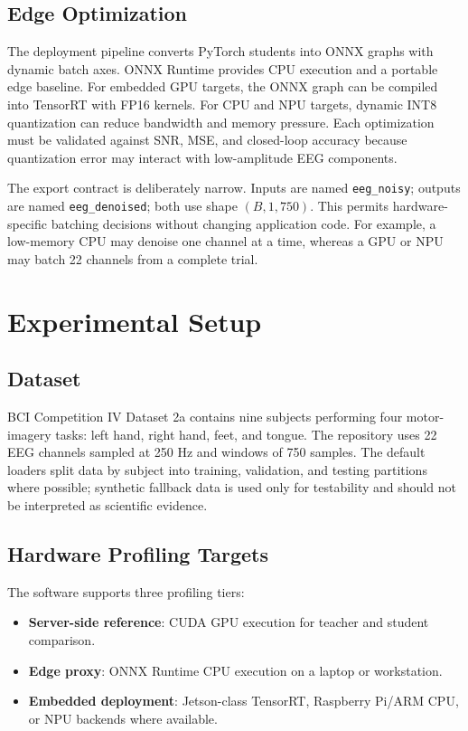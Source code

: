 \documentclass[11pt]{article}
\begin{document}
\subsection{Edge Optimization}

The deployment pipeline converts PyTorch students into ONNX graphs with dynamic batch axes. ONNX Runtime provides CPU execution and a portable edge baseline. For embedded GPU targets, the ONNX graph can be compiled into TensorRT with FP16 kernels. For CPU and NPU targets, dynamic INT8 quantization can reduce bandwidth and memory pressure. Each optimization must be validated against SNR, MSE, and closed-loop accuracy because quantization error may interact with low-amplitude EEG components.

The export contract is deliberately narrow. Inputs are named \texttt{eeg\_noisy}; outputs are named \texttt{eeg\_denoised}; both use shape \((B,1,750)\). This permits hardware-specific batching decisions without changing application code. For example, a low-memory CPU may denoise one channel at a time, whereas a GPU or NPU may batch 22 channels from a complete trial.

\section{Experimental Setup}

\subsection{Dataset}

BCI Competition IV Dataset 2a contains nine subjects performing four motor-imagery tasks: left hand, right hand, feet, and tongue. The repository uses 22 EEG channels sampled at 250 Hz and windows of 750 samples. The default loaders split data by subject into training, validation, and testing partitions where possible; synthetic fallback data is used only for testability and should not be interpreted as scientific evidence.

\subsection{Hardware Profiling Targets}

The software supports three profiling tiers:

\begin{itemize}
    \item \textbf{Server-side reference}: CUDA GPU execution for teacher and student comparison.
    \item \textbf{Edge proxy}: ONNX Runtime CPU execution on a laptop or workstation.
    \item \textbf{Embedded deployment}: Jetson-class TensorRT, Raspberry Pi/ARM CPU, or NPU backends where available.
\end{itemize}
\end{document}

